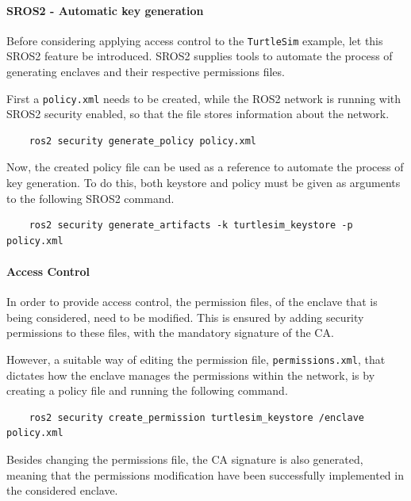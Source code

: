 \paragraph{SROS2 - Automatic key generation}
            
Before considering applying access control to the \texttt{TurtleSim} example, let this SROS2 feature be introduced. SROS2 supplies tools to automate the process of generating enclaves and their respective permissions files. 

First a \texttt{policy.xml} needs to be created, while the ROS2 network is running with SROS2 security enabled, so that the file stores information about the network. 
                
\begin{verbatim}
    ros2 security generate_policy policy.xml
\end{verbatim}

Now, the created policy file can be used as a reference to automate the process of key generation. To do this, both keystore and policy must be given as arguments to the following SROS2 command.

\begin{verbatim}
    ros2 security generate_artifacts -k turtlesim_keystore -p policy.xml
\end{verbatim}

\paragraph{Access Control}
            
In order to provide access control, the permission files, of the enclave that is being considered, need to be modified. This is ensured by adding security permissions to these files, with the mandatory signature of the CA. 
                
However, a suitable way of editing the permission file, \texttt{permissions.xml}, that dictates how the enclave manages the permissions within the network, is by creating a policy file and running the following command.
                
\begin{verbatim}
    ros2 security create_permission turtlesim_keystore /enclave policy.xml
\end{verbatim}
    
Besides changing the permissions file, the CA signature is also generated, meaning that the permissions modification have been successfully implemented in the considered enclave.

